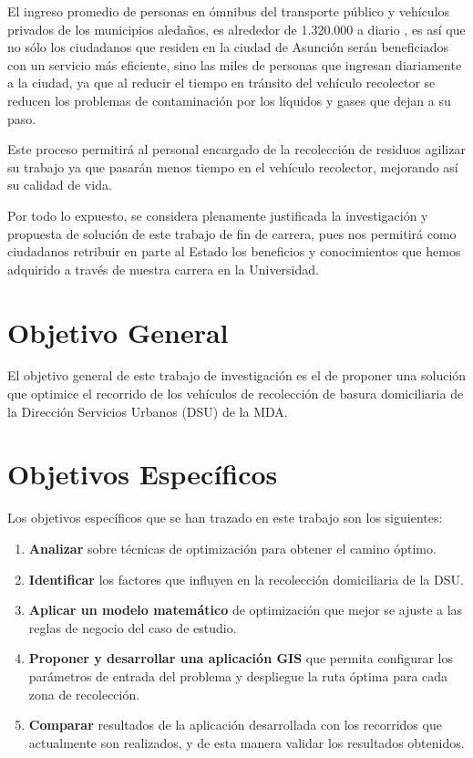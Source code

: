 El ingreso promedio de personas en ómnibus del transporte público y vehículos privados de los municipios aledaños, es alrededor de 1.320.000 a diario \citep{DiarioABCColor2016PorColor}, es así que no sólo los ciudadanos que residen en la ciudad de Asunción serán beneficiados con un servicio más eficiente, sino las miles de personas que ingresan diariamente a la ciudad, ya que al reducir el tiempo en tránsito del vehículo recolector se reducen los problemas de contaminación por los líquidos y gases que dejan a su paso.

Este proceso permitirá al personal encargado de la recolección de residuos agilizar su trabajo ya que pasarán menos tiempo en el vehículo recolector, mejorando así su calidad de vida.
 
Por todo lo expuesto, se considera plenamente justificada la investigación y propuesta de solución de este trabajo de fin de carrera, pues nos permitirá como ciudadanos retribuir en parte al Estado los beneficios y conocimientos que hemos adquirido a través de nuestra carrera en la Universidad.

\section{Objetivo General}
El objetivo general de este trabajo de investigación es el de proponer una solución que optimice el recorrido de los vehículos de recolección de basura domiciliaria de la Dirección Servicios Urbanos (DSU) de la MDA.

\section{Objetivos Específicos}

Los objetivos específicos que se han trazado en este trabajo son los siguientes:

\begin{enumerate}
    \item \textbf{Analizar} sobre técnicas de optimización para obtener el camino óptimo. 
    \item \textbf{Identificar} los factores que influyen en la recolección domiciliaria de la DSU.
    \item \textbf{Aplicar un modelo matemático} de optimización que mejor se ajuste a las reglas de negocio del caso de estudio.
    \item \textbf{Proponer y desarrollar una aplicación GIS} que permita configurar los parámetros de entrada del problema y despliegue la ruta óptima para cada zona de recolección.
    \item \textbf{Comparar} resultados de la aplicación desarrollada con los recorridos que actualmente son realizados, y de esta manera validar los resultados obtenidos.
\end{enumerate}


